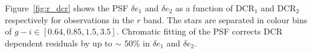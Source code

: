 Figure~\ref{fig:r_dcr} shows the PSF $\delta e_{1}$ and $\delta e_{2}$ as a function of $\mathrm{DCR_1}$ and $\mathrm{DCR_2}$ respectively for observations in the $r$ band.
The stars are separated in colour bins of $g-i \in [0.64, 0.85, 1.5, 3.5]$.
Chromatic fitting of the PSF corrects DCR dependent residuals by up to $\sim$ 50\% in $\delta e_{1}$ and $\delta e_{2}$.

